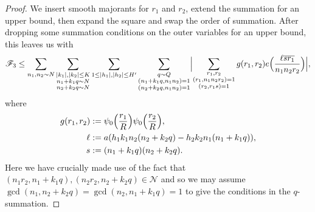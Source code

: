 \documentclass[10pt]{amsart}
\theoremstyle{plain}
\numberwithin{equation}{section}
\begin{document}
\begin{proof}
We insert smooth majorants for $r_1$ and $r_2$, extend the summation for an upper bound, then expand the square and swap the order of summation. After dropping some summation conditions on the outer variables for an upper bound, this leaves us with
\[
\mathscr{F}_3\le \sum_{n_1,n_2\sim N}\sum_{\substack{|k_1|,|k_2|\le K\\ n_1+k_1q\sim N\\ n_2+k_2q\sim N}}\sum_{1\le |h_1|,|h_2|\le H'}\sum_{\substack{q\sim Q\\ (n_1+k_1q,n_1n_2)=1\\ (n_2+k_2q,n_1n_2)=1}}\Bigl|\sum_{\substack{r_1,r_2\\ (r_1,n_1n_2 r_2)=1\\ (r_2,r_1s)=1}}g(r_1,r_2)e\Bigl(\frac{\ell\overline{s r_1}}{n_1n_2r_2}\Bigr)\Bigr|,
\]
where
\begin{align*}
g(r_1,r_2)&:=\psi_0\Bigl(\frac{r_1}{R}\Bigr)\psi_0\Bigl(\frac{r_2}{R}\Bigr),\\
\ell&:=a (h_1 k_1 n_2(n_2+k_2 q)-h_2 k_2 n_1(n_1+k_1 q)),\\
s&:=(n_1+k_1 q)(n_2+k_2q).
\end{align*}
Here we have crucially made use of the fact that $(n_1r_2,n_1+k_1q),(n_2r_2,n_2+k_2q)\in\mathcal{N}$ and so we may assume $\gcd(n_1,n_2+k_2q)=\gcd(n_2,n_1+k_1q)=1$ to give the conditions in the $q$-summation.


\end{proof}
\end{document}
